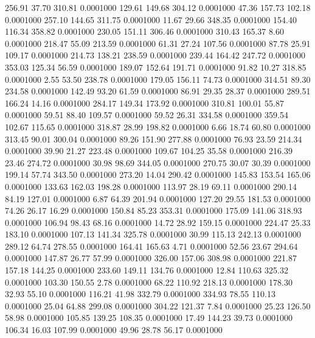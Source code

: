  256.91   37.70  310.81   0.0001000
 129.61  149.68  304.12   0.0001000
  47.36  157.73  102.18   0.0001000
 257.10  144.65  311.75   0.0001000
  11.67   29.66  348.35   0.0001000
 154.40  116.34  358.82   0.0001000
 230.05  151.11  306.46   0.0001000
 310.43  165.37    8.60   0.0001000
 218.47   55.09  213.59   0.0001000
  61.31   27.24  107.56   0.0001000
  87.78   25.91  109.17   0.0001000
 214.73  138.21  238.59   0.0001000
 239.44  164.42  247.72   0.0001000
 353.03  125.34   56.59   0.0001000
 189.07  152.64  191.71   0.0001000
  91.82   10.27  318.85   0.0001000
   2.55   53.50  238.78   0.0001000
 179.05  156.11   74.73   0.0001000
 314.51   89.30  234.58   0.0001000
 142.49   93.20   61.59   0.0001000
  86.91   29.35   28.37   0.0001000
 289.51  166.24   14.16   0.0001000
 284.17  149.34  173.92   0.0001000
 310.81  100.01   55.87   0.0001000
  59.51   88.40  109.57   0.0001000
  59.52   26.31  334.58   0.0001000
 359.54  102.67  115.65   0.0001000
 318.87   28.99  198.82   0.0001000
   6.66   18.74   60.80   0.0001000
 313.45   90.01  300.04   0.0001000
  89.26  151.90  277.88   0.0001000
  76.93   23.59  214.34   0.0001000
  39.90   21.27  223.48   0.0001000
 109.67  104.25   35.58   0.0001000
 216.39   23.46  274.72   0.0001000
  30.98   98.69  344.05   0.0001000
 270.75   30.07   30.39   0.0001000
 199.14   57.74  343.50   0.0001000
 273.20   14.04  290.42   0.0001000
 145.83  153.54  165.06   0.0001000
 133.63  162.03  198.28   0.0001000
 113.97   28.19   69.11   0.0001000
 290.14   84.19  127.01   0.0001000
   6.87   64.39  201.94   0.0001000
 127.20   29.55  181.53   0.0001000
  74.26   26.17   16.29   0.0001000
 150.84   85.23  353.31   0.0001000
 175.09  141.06  318.93   0.0001000
 106.94   98.43   68.16   0.0001000
  14.72   28.92  159.15   0.0001000
 224.47   25.33  183.10   0.0001000
 107.13  141.34  325.78   0.0001000
  30.99  115.13  242.13   0.0001000
 289.12   64.74  278.55   0.0001000
 164.41  165.63    4.71   0.0001000
  52.56   23.67  294.64   0.0001000
 147.87   26.77   57.99   0.0001000
 326.00  157.06  308.98   0.0001000
 221.87  157.18  144.25   0.0001000
 233.60  149.11  134.76   0.0001000
  12.84  110.63  325.32   0.0001000
 103.30  150.55    2.78   0.0001000
  68.22  110.92  218.13   0.0001000
 178.30   32.93   55.10   0.0001000
 116.21   41.98  332.79   0.0001000
 334.93   78.55  110.13   0.0001000
  25.04   64.88  299.08   0.0001000
 304.22  121.37    7.84   0.0001000
  25.23  126.50   58.98   0.0001000
 105.85  139.25  108.35   0.0001000
  17.49  144.23   39.73   0.0001000
 106.34   16.03  107.99   0.0001000
  49.96   28.78   56.17   0.0001000
